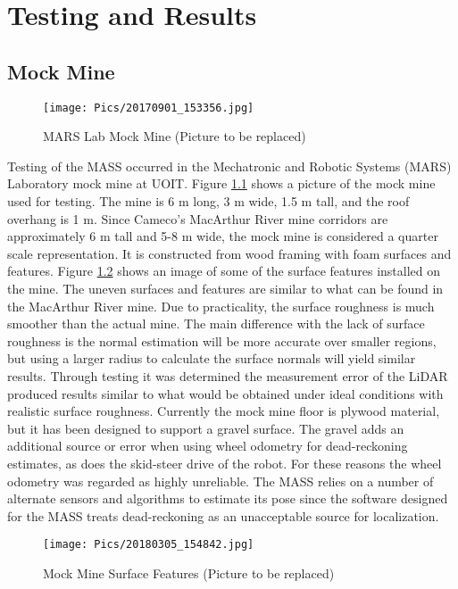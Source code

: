 \chapter{Testing and Results}
\label{chap:testing}

\section{Mock Mine}
\label{sec:mine}
\begin{figure}
    \centering
    \texttt{[image: Pics/20170901\_153356.jpg]}
    \caption{MARS Lab Mock Mine (Picture to be replaced)}
    \label{fig:mockmine}
\end{figure}
Testing of the MASS occurred in the Mechatronic and Robotic Systems (MARS) Laboratory mock mine at UOIT. Figure \ref{fig:mockmine} shows a picture of the mock mine used for testing. The mine is 6 m long, 3 m wide, 1.5 m tall, and the roof overhang is 1 m. Since Cameco's MacArthur River mine corridors are approximately 6 m tall and 5-8 m wide, the mock mine is considered a quarter scale representation. It is constructed from wood framing with foam surfaces and features. Figure \ref{fig:surfacefeature} shows an image of some of the surface features installed on the mine. The uneven surfaces and features are similar to what can be found in the MacArthur River mine. Due to practicality, the surface roughness is much smoother than the actual mine. The main difference with the lack of surface roughness is the normal estimation will be more accurate over smaller regions, but using a larger radius to calculate the surface normals will yield similar results. Through testing it was determined the measurement error of the LiDAR produced results similar to what would be obtained under ideal conditions with realistic surface roughness. Currently the mock mine floor is plywood material, but it has been designed to support a gravel surface. The gravel adds an additional source or error when using wheel odometry for dead-reckoning estimates, as does the skid-steer drive of the robot. For these reasons the wheel odometry was regarded as highly unreliable. The MASS relies on a number of alternate sensors and algorithms to estimate its pose since the software designed for the MASS treats dead-reckoning as an unacceptable source for localization.\\
\begin{figure}
    \centering
    \texttt{[image: Pics/20180305\_154842.jpg]}
    \caption{Mock Mine Surface Features (Picture to be replaced)}
    \label{fig:surfacefeature}
\end{figure}
